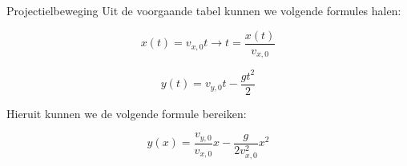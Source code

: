 \begin{app}[Projectielbeweging]{Projectielbeweging}
    \noindent Uit de voorgaande tabel kunnen we volgende formules halen: 
    
        \begin{equation*}
            x(t) = v_{x,0}t \to t = \dfrac{x(t)}{v_{x,0}}
        \end{equation*}
        
        \begin{equation*}
            y(t) = v_{y,0}t - \dfrac{gt^2}{2}
        \end{equation*}

    \vspace{0.25cm}
    \noindent Hieruit kunnen we de volgende formule bereiken:
    
    \begin{equation*}
        y(x) = \dfrac{v_{y,0}}{v_{x,0}}x - \dfrac{g}{2v_{x,0}^2}x^2
    \end{equation*}
    
    
\end{app}
